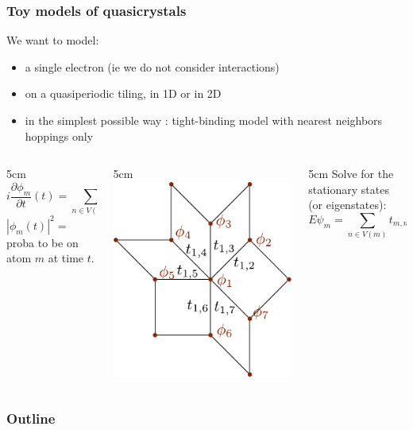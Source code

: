 \documentclass[xcolor=x11names,compress,professionalfonts, aspectratio=169]{beamer}
\renewcommand{\(}{\begin{columns}}
\renewcommand{\)}{\end{columns}}
\newcommand{\<}[1]{\begin{column}{#1}}
\renewcommand{\>}{\end{column}}
\begin{document}
\begin{frame}
\frametitle{Toy models of quasicrystals}
We want to model:
\begin{itemize}
	\item a single electron (ie we do not consider interactions)
	\item on a quasiperiodic tiling, in 1D or in 2D
	\item in the simplest possible way : tight-binding model with nearest neighbors hoppings only
\end{itemize}

\begin{columns}
\<{5cm}
\[
	i \frac{\partial \phi_m}{\partial t}(t) = \sum_{n \in V(m)} t_{m,n} \phi_n(t)
\]
$|\phi_m(t)|^2= $ proba to be on atom $m$ at time $t$.
\>

\<{5cm}
\centering
\includegraphics[scale=0.45]{img/ham_example.pdf}
\>

\<{5cm}
Solve for the stationary states (or eigenstates):
\[
	E \psi_m = \sum_{n \in V(m)} t_{m,n} \psi_n
\]
\>
\end{columns}
\end{frame}

\begin{frame}
\frametitle{Outline}
\tableofcontents[hideallsubsections]
\end{frame}
\end{document}
